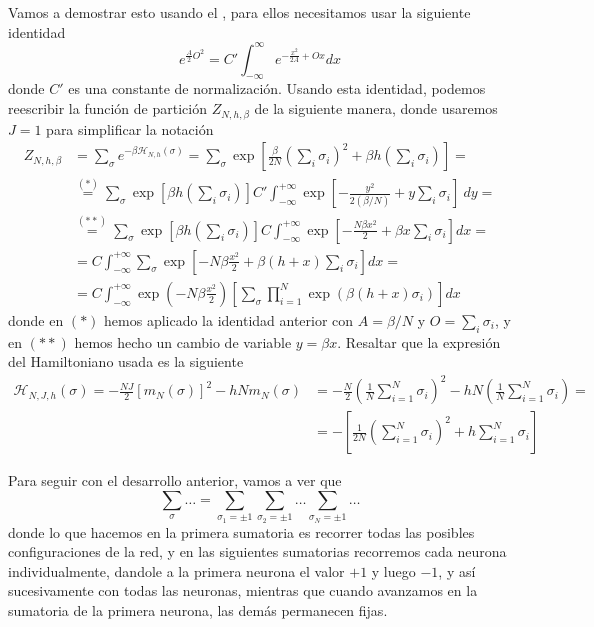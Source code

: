 \noindent
Vamos a demostrar esto usando el , para ellos necesitamos usar la siguiente identidad
\begin{equation*}
    e^{\frac{A}{2} O^2} = C' \int_{-\infty}^{\infty} e^{- \frac{x^2}{2A}  + Ox} dx
\end{equation*}
donde $C'$ es una constante de normalización. Usando esta identidad, podemos reescribir la función de partición $Z_{N,h,\beta}$ de la siguiente manera, donde usaremos $J=1$ para simplificar la notación
\begin{align*}
    Z_{N,h,\beta} &= \sum_{\sigma} e^{-\beta \mathcal{H}_{N,h}(\sigma)} = \sum_{\sigma} \exp \left[ \frac{\beta }{2N} \left( \sum_i \sigma_i \right)^2 + \beta h \left( \sum_i \sigma_i \right) \right]=\\
    &\overset{(*)}{=}\sum_{\sigma}\exp\left[\beta h \left( \sum_i \sigma_i \right)\right]C' \int_{-\infty}^{+\infty} \exp \left[ -\frac{y^2}{2(\beta / N)} + y \sum_i \sigma_i \right] \ dy =\\
    &\overset{(**)}{=}\sum_{\sigma} \exp\left[\beta h \left( \sum_i \sigma_i \right)\right] C 
    \int_{-\infty}^{+\infty} \exp \left[ - \frac{N \beta x^2}{2} + \beta x \sum_i \sigma_i \right] dx=\\
    &= C \int_{-\infty}^{+\infty}  \sum_{\sigma} \exp \left[ -N \beta \frac{x^2}{2} + \beta (h + x) \sum_i \sigma_i \right] dx= \\
    & = C \int_{-\infty}^{+\infty}  \exp\left(-N \beta \frac{x^2}{2}\right)\left[ \sum_{\sigma} \prod_{i=1}^{N} \exp\left(\beta (h + x) \sigma_i\right)\right] dx 
\end{align*}
donde en $(*)$ hemos aplicado la identidad anterior con $A = \beta / N$ y $O = \sum_{i} \sigma_i$, y en $(**)$ hemos hecho un cambio de variable $y=\beta x$. Resaltar que la expresión del Hamiltoniano usada es la siguiente
\begin{align*}
    \mathcal{H}_{N,J,h}(\sigma) = - \frac{NJ}{2} [m_N(\sigma)]^2 - hN m_N(\sigma)&=- \frac{N}{2} \left( \frac{1}{N} \sum_{i=1}^N \sigma_i \right)^2 - hN \left( \frac{1}{N} \sum_{i=1}^N \sigma_i \right)= \\
    &=- \left[ \frac{1}{2N} \left( \sum_{i=1}^N \sigma_i \right)^2 + h \sum_{i=1}^N \sigma_i \right]
\end{align*}

\noindent
Para seguir con el desarrollo anterior, vamos a ver que 
\begin{equation*}
    \sum_{\sigma} \dots = \sum_{\sigma_1 = \pm 1} \sum_{\sigma_2 = \pm 1} \dots \sum_{\sigma_N = \pm 1} \dots
\end{equation*}
donde lo que hacemos en la primera sumatoria es recorrer todas las posibles configuraciones de la red, y en las siguientes sumatorias recorremos cada neurona individualmente, dandole a la primera neurona el valor $+1$ y luego $-1$, y así sucesivamente con todas las neuronas, mientras que cuando avanzamos en la sumatoria de la primera neurona, las demás permanecen fijas. \\

